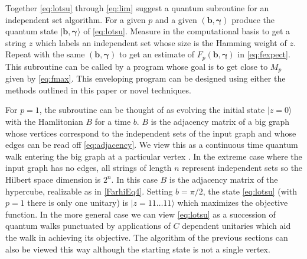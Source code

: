 \documentclass[t11pt,reprint,preprint,preprintnumbers]{revtex4}
\begin{document}
Together \eqref{eq:lotsu} through \eqref{eq:lim} suggest a quantum subroutine for an independent set algorithm.  For a given $p$ and a given $(\mathbf{b},\boldsymbol{\gamma})$ produce the quantum state  $| \mathbf{b} , \boldsymbol{\gamma} \rangle$  of \eqref{eq:lotsu}.   Measure in the computational basis to get a string $z$ which labels an independent set whose size is the Hamming weight of $z$.  Repeat with the same $(\mathbf{b} , \boldsymbol{\gamma})$ to get an estimate of $F_p (\mathbf{b},\boldsymbol{\gamma})$ in \eqref{eq:fexpect}.  This subroutine can be called by a program whose goal is to get close to $M_p$ given by \eqref{eq:fmax}.   This enveloping program can be designed using either the methods outlined in this paper or novel techniques.

For $p=1$, the subroutine can be thought of as evolving the initial state $|z\!=\!0\rangle$ with the Hamlitonian $B$ for a time $b$.  $B$ is the adjacency matrix of a big graph whose vertices correspond to the independent sets of the input graph and whose edges can be read off \eqref{eq:adjacency}.  We view this as a continuous time quantum walk entering the big graph at a particular vertex \cite{farhi-2007}. In the extreme case where the input graph has no edges, all strings of length $n$ represent independent sets so the Hilbert space dimension is $2^n$.  In this case $B$ is the adjacency matrix of the hypercube, realizable as in \eqref{FarhiEq4}.  Setting $b=\pi / 2$, the state \eqref{eq:lotsu} (with $p=1$ there is only one unitary) is  $|z=11\ldots 11\rangle$  which maximizes the objective function.   In the more general case we can view \eqref{eq:lotsu} as a succession of quantum walks punctuated by applications of $C$ dependent unitaries which aid the walk in achieving its objective.  The algorithm of the previous sections can also be viewed this way although the starting state is not a single vertex.  
\end{document}
